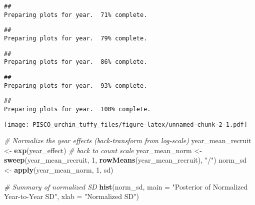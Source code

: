 \documentclass[
]{article}
\newenvironment{Shaded}{\begin{snugshade}}{\end{snugshade}}
\newcommand{\AttributeTok}[1]{\textcolor[rgb]{0.13,0.29,0.53}{#1}}
\newcommand{\CommentTok}[1]{\textcolor[rgb]{0.56,0.35,0.01}{\textit{#1}}}
\newcommand{\DecValTok}[1]{\textcolor[rgb]{0.00,0.00,0.81}{#1}}
\newcommand{\FunctionTok}[1]{\textcolor[rgb]{0.13,0.29,0.53}{\textbf{#1}}}
\newcommand{\NormalTok}[1]{#1}
\newcommand{\OtherTok}[1]{\textcolor[rgb]{0.56,0.35,0.01}{#1}}
\newcommand{\SpecialCharTok}[1]{\textcolor[rgb]{0.81,0.36,0.00}{\textbf{#1}}}
\newcommand{\StringTok}[1]{\textcolor[rgb]{0.31,0.60,0.02}{#1}}
\begin{document}
\begin{verbatim}
##                                                                                 Preparing plots for year.  71% complete.
\end{verbatim}

\begin{verbatim}
##                                                                                 Preparing plots for year.  79% complete.
\end{verbatim}

\begin{verbatim}
##                                                                                 Preparing plots for year.  86% complete.
\end{verbatim}

\begin{verbatim}
##                                                                                 Preparing plots for year.  93% complete.
\end{verbatim}

\begin{verbatim}
##                                                                                 Preparing plots for year.  100% complete.
\end{verbatim}

\begin{Shaded}
\end{Shaded}

\texttt{[image: PISCO\_urchin\_tuffy\_files/figure-latex/unnamed-chunk-2-1.pdf]}

\begin{Shaded}
\begin{Highlighting}[]
\CommentTok{\# Normalize the year effects (back{-}transform from log{-}scale)}
\NormalTok{year\_mean\_recruit }\OtherTok{\textless{}{-}} \FunctionTok{exp}\NormalTok{(year\_effect)  }\CommentTok{\# back to count scale}
\NormalTok{year\_mean\_norm }\OtherTok{\textless{}{-}} \FunctionTok{sweep}\NormalTok{(year\_mean\_recruit, }\DecValTok{1}\NormalTok{, }\FunctionTok{rowMeans}\NormalTok{(year\_mean\_recruit), }\StringTok{"/"}\NormalTok{)}
\NormalTok{norm\_sd }\OtherTok{\textless{}{-}} \FunctionTok{apply}\NormalTok{(year\_mean\_norm, }\DecValTok{1}\NormalTok{, sd)}

\CommentTok{\# Summary of normalized SD}
\FunctionTok{hist}\NormalTok{(norm\_sd, }\AttributeTok{main =} \StringTok{"Posterior of Normalized Year{-}to{-}Year SD"}\NormalTok{,}
     \AttributeTok{xlab =} \StringTok{"Normalized SD"}\NormalTok{)}
\end{Highlighting}
\end{Shaded}
\end{document}

